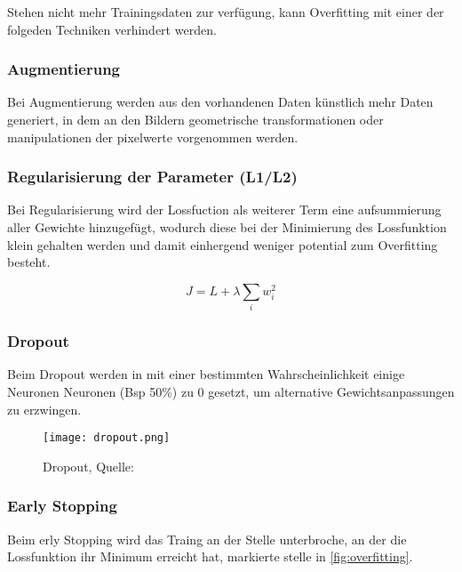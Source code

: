 \vspace{1cm}
\begin{figure}[H]
    \centering
    \def\svgwidth{0.95\textwidth}
    
    \caption{}
    \label{fig:over_under_fit}
\end{figure}
\vspace{1cm}


Stehen nicht mehr Trainingsdaten zur verfügung, kann Overfitting
mit einer der folgeden Techniken verhindert werden.


\subsubsection{Augmentierung}
Bei Augmentierung werden aus den vorhandenen Daten künstlich mehr 
Daten generiert, in dem an den Bildern geometrische transformationen 
oder manipulationen der pixelwerte vorgenommen werden.

\subsubsection{Regularisierung der Parameter (L1/L2)}
Bei Regularisierung wird der Lossfuction als weiterer Term
eine aufsummierung aller Gewichte hinzugefügt,
wodurch diese bei der Minimierung des Lossfunktion 
klein gehalten werden und damit einhergend weniger potential 
zum Overfitting besteht.

\begin{equation}
    \label{eq:regularization}
    J = L + \lambda \sum_{i} w_{i}^{2}
\end{equation}

\subsubsection{Dropout}
Beim Dropout werden in mit einer bestimmten Wahrscheinlichkeit 
einige Neuronen Neuronen (Bsp 50\%) zu 0 gesetzt, um 
alternative Gewichtsanpassungen zu erzwingen.

\begin{figure}[H]
    \centering
    \texttt{[image: dropout.png]}
    \caption{Dropout, Quelle: \cite{maksutovDeepStudyNot2018}}
    \label{fig:dropout}
\end{figure}

\subsubsection{Early Stopping}
Beim erly Stopping wird das Traing an der 
Stelle unterbroche, an der die Lossfunktion ihr 
Minimum erreicht hat, markierte stelle in 
\ref{fig:overfitting}.


